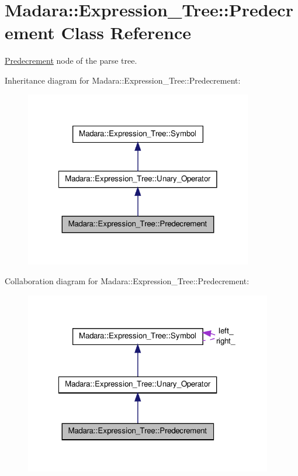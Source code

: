 \hypertarget{classMadara_1_1Expression__Tree_1_1Predecrement}{
\section{Madara::Expression\_\-Tree::Predecrement Class Reference}
\label{d2/def/classMadara_1_1Expression__Tree_1_1Predecrement}
}


\hyperlink{classMadara_1_1Expression__Tree_1_1Predecrement}{Predecrement} node of the parse tree.  




Inheritance diagram for Madara::Expression\_\-Tree::Predecrement:
\nopagebreak
\begin{figure}[H]
\begin{center}
\leavevmode
\includegraphics[width=282pt]{d0/dea/classMadara_1_1Expression__Tree_1_1Predecrement__inherit__graph}
\end{center}
\end{figure}


Collaboration diagram for Madara::Expression\_\-Tree::Predecrement:
\nopagebreak
\begin{figure}[H]
\begin{center}
\leavevmode
\includegraphics[width=307pt]{d8/dd5/classMadara_1_1Expression__Tree_1_1Predecrement__coll__graph}
\end{center}
\end{figure}
